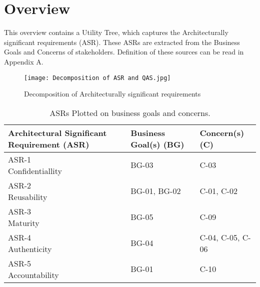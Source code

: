 \chapter{Overview}\label{s:overview}
This overview contains a Utility Tree, which captures the Architecturally significant requirements (ASR). These ASRs are extracted from the Business Goals and Concerns of stakeholders. Definition of these sources can be read in Appendix A.

\graphicspath{ {./images/} }
\begin{figure}[t]
\centering
\texttt{[image: Decomposition of ASR and QAS.jpg]}\\
\caption{Decomposition of Architecturally significant requirements}
\label{fig:ASR1}
\end{figure}

\begin{table}[h!]
\centering
\begin{tabular}{||l l l||} 
 \hline
 Architectural Significant Requirement (ASR) & Business Goal(s) (BG) & Concern(s) (C)\\ [0.5ex] 
 \hline\hline
 \makecell{ASR-1 \\ Confidentiallity} & BG-03 & C-03 \\ 
 \hline
\makecell{ASR-2 \\ Reusability} & BG-01, BG-02 & C-01, C-02  \\
  \hline
\makecell{ASR-3 \\ Maturity} & BG-05 &  C-09  \\
  \hline
\makecell{ASR-4 \\ Authenticity} & BG-04 & C-04, C-05, C-06 \\
  \hline
\makecell{ASR-5 \\ Accountability} & BG-01 & C-10  \\ [1ex] 
 \hline
\end{tabular}
\caption{ASRs Plotted on business goals and concerns.}
\label{ASR_BG_C}
\end{table}

